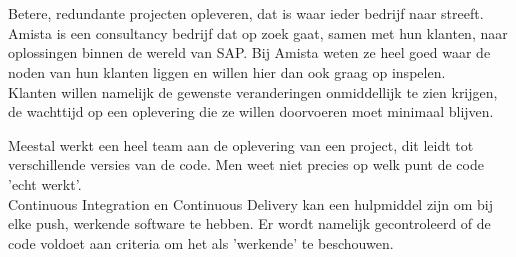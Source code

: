 
%
%

%



\chapter*{}
Betere, redundante projecten opleveren, dat is waar ieder bedrijf naar streeft.\\
Amista is een consultancy bedrijf dat op zoek gaat, samen met hun klanten, naar oplossingen binnen de wereld van SAP.
Bij Amista weten ze heel goed waar de noden van hun klanten liggen en willen hier dan ook graag op inspelen.\\
Klanten willen namelijk de gewenste veranderingen onmiddellijk te zien krijgen, de wachttijd op een oplevering die ze willen doorvoeren moet minimaal blijven.

Meestal werkt een heel team aan de oplevering van een project, dit leidt tot verschillende versies van de code. Men weet niet precies op welk punt de code 'echt werkt'. \\
Continuous Integration en Continuous Delivery kan een hulpmiddel zijn om bij elke push, werkende software te hebben. Er wordt namelijk gecontroleerd of de code voldoet aan criteria om het als 'werkende' te beschouwen.

